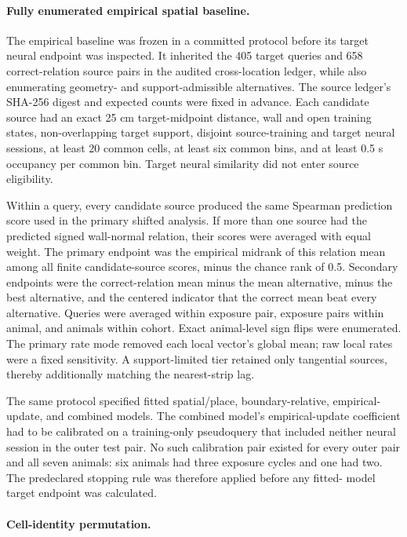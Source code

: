 \documentclass[10pt,twocolumn]{article}
\begin{document}
\paragraph{Fully enumerated empirical spatial baseline.}

The empirical baseline was frozen in a committed protocol before its target
neural endpoint was inspected. It inherited the 405 target queries and 658
correct-relation source pairs in the audited cross-location ledger, while also
enumerating geometry- and support-admissible alternatives. The source ledger's
SHA-256 digest and expected counts were fixed in advance. Each candidate source
had an exact 25 cm target-midpoint distance, wall and open training states,
non-overlapping target support, disjoint source-training and target neural
sessions, at least 20 common cells, at least six common bins, and at least
0.5 s occupancy per common bin. Target neural similarity did not enter source
eligibility.

Within a query, every candidate source produced the same Spearman prediction
score used in the primary shifted analysis. If more than one source had the
predicted signed wall-normal relation, their scores were averaged with equal
weight. The primary endpoint was the empirical midrank of this relation mean
among all finite candidate-source scores, minus the chance rank of 0.5.
Secondary endpoints were the correct-relation mean minus the mean alternative,
minus the best alternative, and the centered indicator that the correct mean
beat every alternative. Queries were averaged within exposure pair, exposure
pairs within animal, and animals within cohort. Exact animal-level sign flips
were enumerated. The primary rate mode removed each local vector's global mean;
raw local rates were a fixed sensitivity. A support-limited tier retained only
tangential sources, thereby additionally matching the nearest-strip lag.

The same protocol specified fitted spatial/place, boundary-relative, empirical-
update, and combined models. The combined model's empirical-update coefficient
had to be calibrated on a training-only pseudoquery that included neither neural
session in the outer test pair. No such calibration pair existed for every
outer pair and all seven animals: six animals had three exposure cycles and one
had two. The predeclared stopping rule was therefore applied before any fitted-
model target endpoint was calculated.

\paragraph{Cell-identity permutation.}
\end{document}
